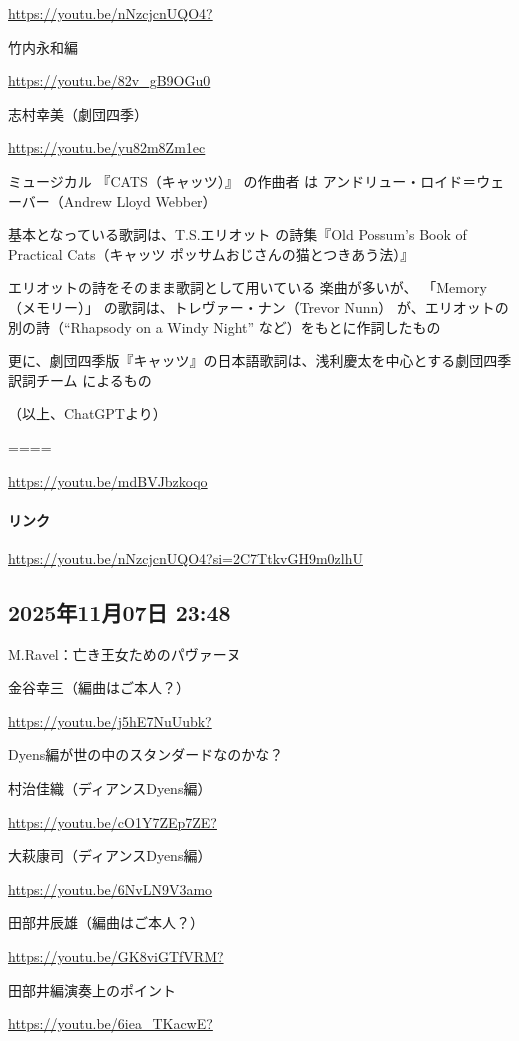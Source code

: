 \url{https://youtu.be/nNzcjcnUQO4?}

竹内永和編

\url{https://youtu.be/82v_gB9OGu0}

志村幸美（劇団四季）

\url{https://youtu.be/yu82m8Zm1ec}

ミュージカル 『CATS（キャッツ）』 の作曲者 は アンドリュー・ロイド＝ウェーバー（Andrew Lloyd Webber）

基本となっている歌詞は、T.S.エリオット の詩集『Old Possum’s Book of Practical Cats（キャッツ ポッサムおじさんの猫とつきあう法）』

エリオットの詩をそのまま歌詞として用いている 楽曲が多いが、 「Memory（メモリー）」 の歌詞は、トレヴァー・ナン（Trevor Nunn） が、エリオットの別の詩（“Rhapsody on a Windy Night” など）をもとに作詞したもの

更に、劇団四季版『キャッツ』の日本語歌詞は、浅利慶太を中心とする劇団四季訳詞チーム によるもの

（以上、ChatGPTより）

====

\url{https://youtu.be/mdBVJbzkoqo}

\paragraph{リンク}
\url{https://youtu.be/nNzcjcnUQO4?si=2C7TtkvGH9m0zlhU}

\subsection*{2025年11月07日 23:48}

M.Ravel：亡き王女ためのパヴァーヌ

金谷幸三（編曲はご本人？）

\url{https://youtu.be/j5hE7NuUubk?}

Dyens編が世の中のスタンダードなのかな？

村治佳織（ディアンスDyens編）

\url{https://youtu.be/cO1Y7ZEp7ZE?}

大萩康司（ディアンスDyens編）

\url{https://youtu.be/6NvLN9V3amo}

田部井辰雄（編曲はご本人？）

\url{https://youtu.be/GK8viGTfVRM?}

田部井編演奏上のポイント

\url{https://youtu.be/6iea_TKacwE?}


